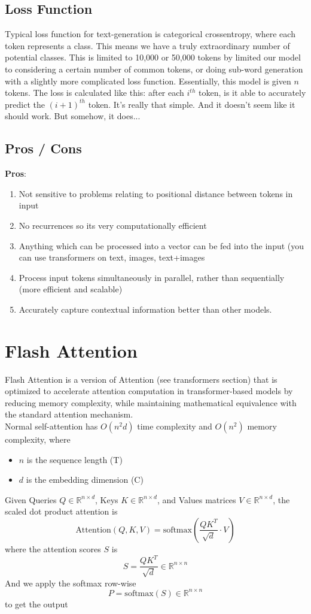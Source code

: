 \documentclass[12pt]{article}
\begin{document}
\subsection{Loss Function}
Typical loss function for text-generation is categorical crossentropy, where each token represents a class. This means we have a truly extraordinary number of potential classes. This is limited to 10,000 or 50,000 tokens by limited our model to considering a certain number of common tokens, or doing sub-word generation with a slightly more complicated loss function. Essentially, this model is given \(n\) tokens. The loss is calculated like this: after each \(i^{th}\) token, is it able to accurately predict the \((i+1)^{th}\) token. It's really that simple. And it doesn't seem like it should work. But somehow, it does...

\subsection{Pros / Cons}
\textbf{Pros}: 
\begin{enumerate}
\item Not sensitive to problems relating to positional distance between tokens in input
\item No recurrences so its very computationally efficient
\item Anything which can be processed into a vector can be fed into the input (you can use transformers on text, images, text+images
\item Process input tokens simultaneously in parallel, rather than sequentially (more efficient and scalable)
\item Accurately capture contextual information better than other models.
\end{enumerate}
\section{Flash Attention}
Flash Attention is a version of Attention (see transformers section) that is optimized to accelerate attention computation in transformer-based models by reducing memory complexity, while maintaining mathematical equivalence with the standard attention mechanism. \\

Normal self-attention has \(O(n^2d)\) time complexity and \(O(n^2)\) memory complexity, where 
\begin{itemize}
\item \(n\) is the sequence length (T)
\item \(d\) is the embedding dimension (C)
\end{itemize}
Given Queries \(Q \in \mathbb{R}^{n \times d}\), Keys \(K \in \mathbb{R}^{n \times d}\), and Values matrices \(V \in \mathbb{R}^{n \times d}\), the scaled dot product attention is
\[\text{Attention}(Q,K,V) = \text{softmax}\left(\frac{QK^T}{\sqrt{d}}\cdot V\right)\]
where the attention scores \(S\) is
\[
S = \frac{QK^T}{\sqrt{d}} \in \mathbb{R}^{n\times n}
\]
And we apply the softmax row-wise 
\[
P = \text{softmax}(S) \in \mathbb{R}^{n\times n}
\] 
to get the output
\end{document}

